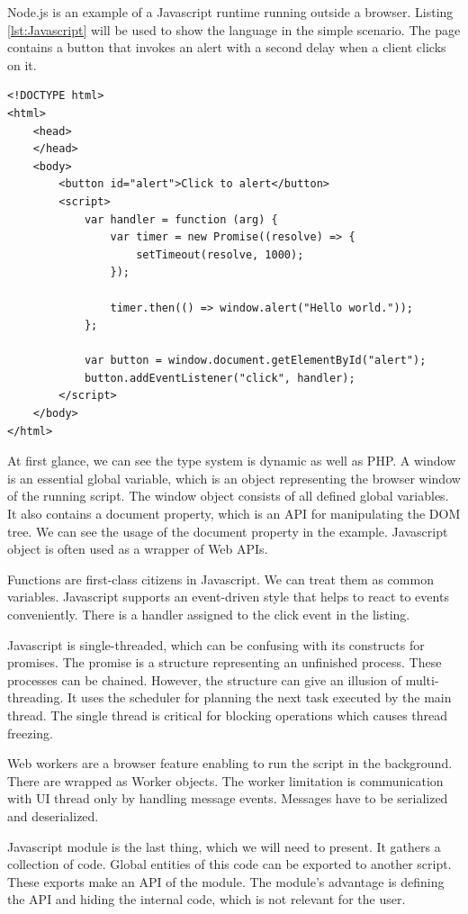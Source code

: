 Node.js is an example of a Javascript runtime running outside a browser.
Listing \ref{lst:Javascript} will be used to show the language in the simple scenario.
The page contains a button that invokes an alert with a second delay when a client clicks on it.
\par
\begin{minipage}[c]{0.95\textwidth}
\begin{lstlisting}[basicstyle=\small, caption=A Javascript code., label={lst:Javascript}]
<!DOCTYPE html>
<html>
	<head>
	</head>
	<body>
		<button id="alert">Click to alert</button>
		<script>
			var handler = function (arg) {
				var timer = new Promise((resolve) => {
					setTimeout(resolve, 1000);
				}); 
        
				timer.then(() => window.alert("Hello world."));
			};  

			var button = window.document.getElementById("alert");
			button.addEventListener("click", handler);
		</script>
	</body>
</html>
\end{lstlisting}
\end{minipage}
\par
At first glance, we can see the type system is dynamic as well as PHP.
A window is an essential global variable, which is an object representing the browser window of the running script.
The window object consists of all defined global variables.
It also contains a document property, which is an API for manipulating the DOM tree.
We can see the usage of the document property in the example.
Javascript object is often used as a wrapper of Web APIs.
\par
Functions are first-class citizens in Javascript.
We can treat them as common variables.
Javascript supports an event-driven style that helps to react to events conveniently.
There is a handler assigned to the click event in the listing.
\par
{}
Javascript is single-threaded, which can be confusing with its constructs for promises.
The promise is a structure representing an unfinished process.
These processes can be chained.
However, the structure can give an illusion of multi-threading. It uses the scheduler for planning the next task executed by the main thread.
The single thread is critical for blocking operations which causes thread freezing.
\par
Web workers  are a browser feature enabling to run the script in the background.
There are wrapped as Worker objects.
The worker limitation is communication with UI thread only by handling message events. 
Messages have to be serialized and deserialized.
\par
Javascript module is the last thing, which we will need to present.
It gathers a collection of code.
Global entities of this code can be exported to another script.
These exports make an API of the module.
The module's advantage is defining the API and hiding the internal code, which is not relevant for the user.

